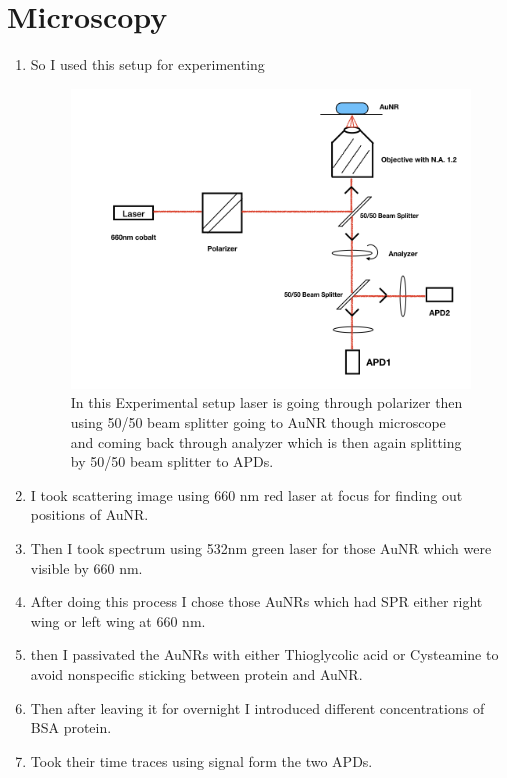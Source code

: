 \documentclass[twoside,single]{lion-msc}
\begin{document}
  \section{Microscopy}
     \begin{enumerate}[I]
   \item  So I used this setup for experimenting
   \begin{figure}[H]
\includegraphics[width=1.1\textwidth,left]{10}
\begin{flushleft}
\caption{In this Experimental setup laser is going through polarizer then using 50/50 beam splitter going to AuNR though microscope and coming back through analyzer which is then again splitting by 50/50 beam splitter to APDs. }
\end{flushleft}
\end{figure}
   \item I took scattering image using 660 nm red laser at focus for finding out positions of AuNR.
   \item Then I took spectrum using 532nm green laser for those AuNR which were visible by 660 nm.
   \item After doing this process I chose those AuNRs which had SPR either right wing or left wing at 660 nm.
   \item then I passivated the AuNRs with either Thioglycolic acid or Cysteamine to avoid nonspecific sticking between protein and AuNR.
   \item Then after leaving it for overnight I introduced different concentrations of BSA protein.
   \item Took their time traces using signal form the two APDs.
   \end{enumerate}
\end{document}
